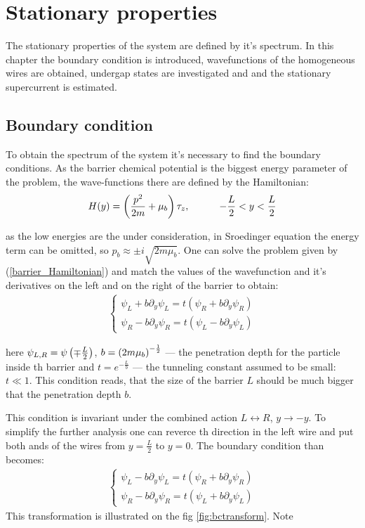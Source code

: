 \chapter{Stationary properties} 
\label{chap:stationary_properties}
The stationary properties of the system are defined by it's spectrum. In this chapter the boundary condition is introduced, wavefunctions of the homogeneous wires are obtained, undergap states are investigated and  and the stationary supercurrent is estimated.

\section{Boundary condition}

To obtain the spectrum of the system it's necessary to find the boundary conditions. As the barrier chemical potential  is the biggest energy parameter of the problem, the wave-functions there are defined by the Hamiltonian:
\begin{gather}
\label{barrier_Hamiltonian}
	H(y)
	=
	\left(
		\frac{p^2}{2m}
		+\mu_b
	\right)\tau_z,  ~~~~~~~~~-\frac{L}{2}<y<\frac{L}{2}
\end{gather} 

as the low energies are the under consideration, in Sroedinger equation the energy term can be omitted, so $ p_b\approx\pm i \sqrt{2m\mu_b} $. One can solve the problem given by (\ref{barrier_Hamiltonian}) and match the values of the wavefunction and it's derivatives on the left and on the right of the barrier to obtain:
\begin{gather}
	\begin{cases}
	\psi_L + b\partial_y\psi_L=t(\psi_R + b\partial_y\psi_R) \\
	\psi_R - b\partial_y\psi_R=t(\psi_L - b\partial_y\psi_L)
	\end{cases}
\end{gather}

here $ \psi_{L,R}=\psi\left(\mp\frac{L}{2}\right) $, $ b=\left({2m\mu_b}\right)^{-\frac{1}{2}} $ --- the penetration depth for the particle inside th barrier and $ t = e^{-\frac{L}{b} }$ --- the tunneling constant assumed to be small: $ t\ll 1 $. This condition reads, that the size of the barrier $ L $ should be  much bigger that the penetration depth $ b $.

This condition is invariant under the combined action $ L\leftrightarrow R $, $ y\to-y $. To simplify the further analysis one can reverce th direction in the left wire and put both ands of the wires from $ y= \frac{L}{2} $ to $ y=0 $. The boundary condition than becomes:
\begin{gather}
\label{bc_transformed}
\begin{cases}
\psi_L - b\partial_y\psi_L=t(\psi_R + b\partial_y\psi_R) \\
\psi_R - b\partial_y\psi_R=t(\psi_L + b\partial_y\psi_L)
\end{cases}
\end{gather}
This transformation is illustrated on the fig \ref{fig:bctransform}. Note

